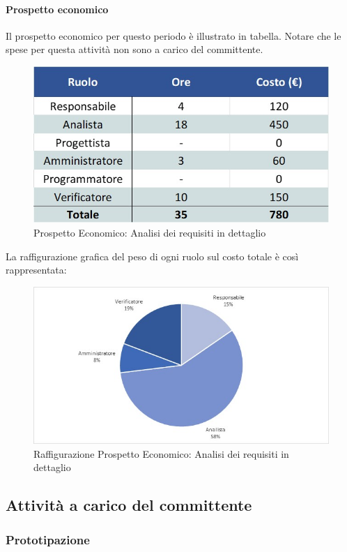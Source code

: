 \paragraph{Prospetto economico}
Il prospetto economico per questo periodo è illustrato in tabella. Notare che le spese per questa attività non sono a carico del committente.
\begin{figure}[H]
	\centerline{\includegraphics[scale=0.7]{img/Preventivo/AnalisiRequisitiDettaglioEconomico.jpg}}
	\caption{Prospetto Economico: Analisi dei requisiti in dettaglio}
	\clearpage
\end{figure}
La raffigurazione grafica del peso di ogni ruolo sul costo totale è così rappresentata: 
\begin{figure}[H]
	\centerline{\includegraphics[scale=0.9]{img/Preventivo/Torte/AnalisiRequisitiDettaglio.jpg}}
	\caption{Raffigurazione Prospetto Economico: Analisi dei requisiti in dettaglio}
	\clearpage
\end{figure}
\newpage
\subsection{Attività a carico del committente}
\subsubsection{Prototipazione}

